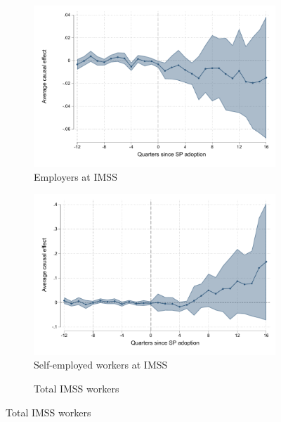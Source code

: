 \documentclass[oneside,11pt]{article}
\begin{document}
\begin{figure}[H]
     \caption{Event studies - Employment}
    \label{event_studies_emp}
\begin{center}
       \begin{subfigure}{0.4\textwidth}
    \caption{Employers at IMSS}
        \includegraphics[width=\textwidth]{Figuras/did_event_ch_p_t.pdf}
    \end{subfigure}
    \begin{subfigure}{0.4\textwidth}
        \caption{Self-employed workers at IMSS}
        \includegraphics[width=\textwidth]{Figuras/did_event_ch_p_1.pdf}
    \end{subfigure}
        \begin{subfigure}{0.4\textwidth}
    \caption{Total IMSS workers}

\end{subfigure}
\end{center}
\end{figure}
\end{document}
